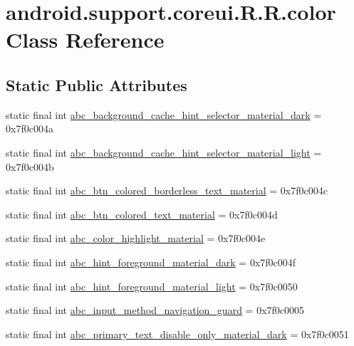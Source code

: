 \hypertarget{classandroid_1_1support_1_1coreui_1_1_r_1_1color}{
\section{android.support.coreui.R.R.color Class Reference}
\label{classandroid_1_1support_1_1coreui_1_1_r_1_1color}
}
\subsection*{Static Public Attributes}
\begin{CompactItemize}
\item 
static final int \hyperlink{classandroid_1_1support_1_1coreui_1_1_r_1_1color_bce2f37e186d2282320dea1170d6368b}{abc\_\-background\_\-cache\_\-hint\_\-selector\_\-material\_\-dark} = 0x7f0c004a
\item 
static final int \hyperlink{classandroid_1_1support_1_1coreui_1_1_r_1_1color_137c69ec14a67801ce6f61c6edae8423}{abc\_\-background\_\-cache\_\-hint\_\-selector\_\-material\_\-light} = 0x7f0c004b
\item 
static final int \hyperlink{classandroid_1_1support_1_1coreui_1_1_r_1_1color_33946879345c1b3247f115a3bb9fba7a}{abc\_\-btn\_\-colored\_\-borderless\_\-text\_\-material} = 0x7f0c004c
\item 
static final int \hyperlink{classandroid_1_1support_1_1coreui_1_1_r_1_1color_9947f2dafc8bad8a32327c42972008b4}{abc\_\-btn\_\-colored\_\-text\_\-material} = 0x7f0c004d
\item 
static final int \hyperlink{classandroid_1_1support_1_1coreui_1_1_r_1_1color_88028b40d12a6fc98bd82545aab344c4}{abc\_\-color\_\-highlight\_\-material} = 0x7f0c004e
\item 
static final int \hyperlink{classandroid_1_1support_1_1coreui_1_1_r_1_1color_606f5be0b2b71542fcbcc3a120c3d670}{abc\_\-hint\_\-foreground\_\-material\_\-dark} = 0x7f0c004f
\item 
static final int \hyperlink{classandroid_1_1support_1_1coreui_1_1_r_1_1color_7fd99103e76687eda808eb0aa8fbebad}{abc\_\-hint\_\-foreground\_\-material\_\-light} = 0x7f0c0050
\item 
static final int \hyperlink{classandroid_1_1support_1_1coreui_1_1_r_1_1color_ea2f7f8e89927bd9867906fb6b0b30dd}{abc\_\-input\_\-method\_\-navigation\_\-guard} = 0x7f0c0005
\item 
static final int \hyperlink{classandroid_1_1support_1_1coreui_1_1_r_1_1color_1a77ee077658394878282d1194d47fbd}{abc\_\-primary\_\-text\_\-disable\_\-only\_\-material\_\-dark} = 0x7f0c0051

\end{CompactItemize}

